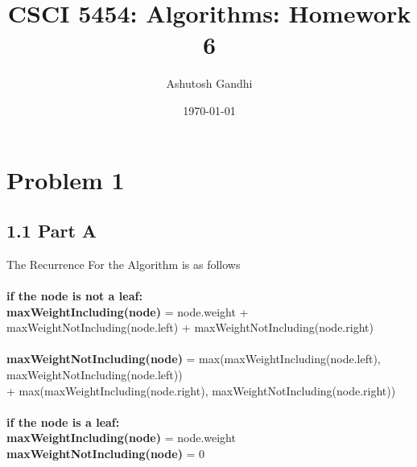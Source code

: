 \documentclass[12pt]{article}
\title{CSCI 5454: Algorithms: Homework 6}
\author{Ashutosh Gandhi}
\date{\today}
\begin{document}
\maketitle

\section*{Problem 1}

\subsection*{1.1 Part A}

\vspace{10pt}


The Recurrence For the Algorithm is as follows \\~\\
\textbf{if the node is not a leaf:}  \\
\textbf{maxWeightIncluding(node)} = node.weight + maxWeightNotIncluding(node.left) + maxWeightNotIncluding(node.right) \\~\\
\textbf{maxWeightNotIncluding(node)} = max(maxWeightIncluding(node.left), maxWeightNotIncluding(node.left)) \\ + max(maxWeightIncluding(node.right), maxWeightNotIncluding(node.right)) \\~\\
\textbf{if the node is a leaf:}  \\ 
\textbf{maxWeightIncluding(node)} = node.weight \\
\textbf{maxWeightNotIncluding(node)} = 0
\end{document}
